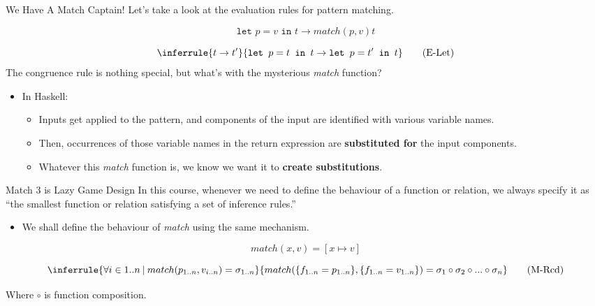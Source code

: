 \documentclass[11pt]{beamer}
\begin{document}
\begin{frame}[fragile=singleslide]{We Have A Match Captain!}
Let's take a look at the evaluation rules for pattern matching.

\begin{equation}
\texttt{let }p = v \texttt{ in } t \rightarrow match(p,v)t \tag{E-LetV}
\end{equation}

\begin{equation}
\inferrule{t \rightarrow t'}{\texttt{let }p = t \texttt{ in } t \rightarrow \texttt{let }p = t' \texttt{ in } t} \tag{E-Let}
\end{equation}
The congruence rule is nothing special, but what's with the mysterious \emph{match} function? 
\begin{itemize}
\item In Haskell:
\begin{itemize}
\item Inputs get applied to the pattern, and components of the input are identified with various variable names.
\item Then, occurrences of those variable names in the return expression are \textbf{substituted for} the input components. 
\item Whatever this \emph{match} function is, we know we want it to \textbf{create substitutions}.
\end{itemize}
\end{itemize}
\end{frame}


\begin{frame}[fragile=singleslide]{Match 3 is Lazy Game Design}
In this course, whenever we need to define the behaviour of a function or relation, we always specify it as ``the smallest function or relation satisfying a set of inference rules.''
\begin{itemize}
\item We shall define the behaviour of \emph{match} using the same mechanism.
\end{itemize}

\begin{equation}
match(x, v) = [x \mapsto v] \tag{M-Var}
\end{equation}

\begin{equation}
\inferrule{\forall i \in 1..n \:|\: match(p_{1..n}, v_{i..n}) = \sigma_{1..n}}{match(\{f_{1..n}=p_{1..n} \}, \{f_{1..n}=v_{1..n} \} ) = \sigma_1 \circ \sigma_2 \circ ... \circ \sigma_n } \tag{M-Rcd}
\end{equation}

Where $\circ$ is function composition.  
\end{frame}
\end{document}
